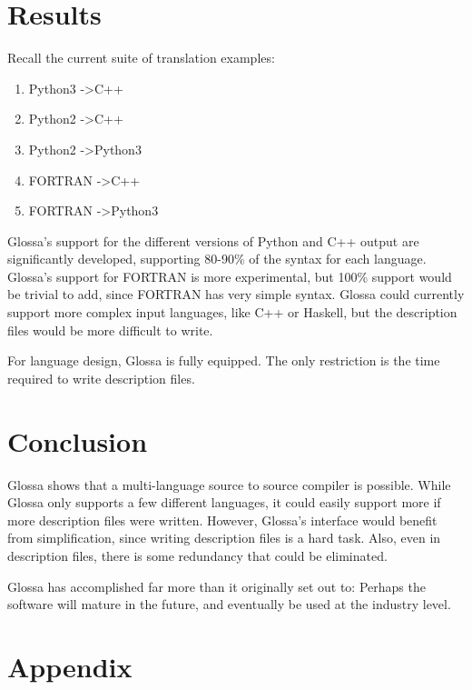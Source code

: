 \documentclass{article}
\begin{document}
\section{Results}

Recall the current suite of translation examples:
\begin{enumerate}
    \item Python3 -\textgreater C++
    \item Python2 -\textgreater C++ 
    \item Python2 -\textgreater Python3
    \item FORTRAN -\textgreater C++ 
    \item FORTRAN -\textgreater Python3 
\end{enumerate}

Glossa's support for the different versions of Python and C++ output are significantly developed, supporting 80-90\% of the syntax for each language. 
Glossa's support for FORTRAN is more experimental, but 100\% support would be trivial to add, since FORTRAN has very simple syntax.
Glossa could currently support more complex input languages, like C++ or Haskell, but the description files would be more difficult to write.

For language design, Glossa is fully equipped. The only restriction is the time required to write description files.

\section{Conclusion}

Glossa shows that a multi-language source to source compiler is possible. 
While Glossa only supports a few different languages, it could easily support more if more description files were written.
However, Glossa's interface would benefit from simplification, since writing description files is a hard task. Also, even in description files, there is some redundancy that could be eliminated.

Glossa has accomplished far more than it originally set out to: Perhaps the software will mature in the future, and eventually be used at the industry level.

\section{Appendix}
\end{document}

